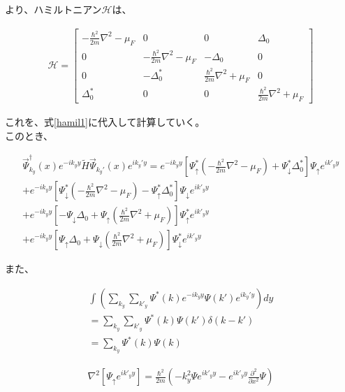 \documentclass{jsarticle}
\begin{document}
		より、ハミルトニアン$\mathcal{H}$は、

		\begin{align}
			\mathcal{H}=
			\begin{bmatrix}
				-\frac{\hbar^2}{2m}\nabla^2-\mu_F & 0 & 0 & \Delta_0 \\
				0 & -\frac{\hbar^2}{2m}\nabla^2-\mu_F & -\Delta_0 & 0 \\
				0 & -\Delta_0^\ast & \frac{\hbar^2}{2m}\nabla^2+\mu_F & 0 \\
				\Delta_0^\ast & 0 & 0 & \frac{\hbar^2}{2m}\nabla^2+\mu_F
			\end{bmatrix}
		\end{align}

		これを、式\eqref{hamil1}に代入して計算していく。　\\
		このとき、

		\begin{align}
			\vec{\Psi}_{k_y}^\dagger(x) e^{-ik_yy} \tilde{H}  \vec{\Psi}_{k_y'}(x) e^{ik_y'y} =
			e^{-ik_yy} \left[ \Psi_\uparrow^\ast \left( -\frac{\hbar^2}{2m}\nabla^2-\mu_F \right) +\Psi_\downarrow^\ast \Delta_0^\ast \right] \Psi_\uparrow e^{ik'_yy} \nonumber\\
			+e^{-ik_yy} \left[ \Psi_\downarrow^\ast \left( -\frac{\hbar^2}{2m}\nabla^2-\mu_F \right) -\Psi_\uparrow^\ast \Delta_0^\ast \right] \Psi_\downarrow e^{ik'_yy} \nonumber\\
			+ e^{-ik_yy} \left[ -\Psi_\downarrow\Delta_0 +\Psi_\uparrow \left( \frac{\hbar^2}{2m}\nabla^2+\mu_F \right) \right] \Psi_\uparrow^\ast e^{ik'_yy} \nonumber\\
			+e^{-ik_yy} \left[ \Psi_\uparrow\Delta_0 +\Psi_\downarrow \left( \frac{\hbar^2}{2m}\nabla^2+\mu_F \right) \right] \Psi_\downarrow^\ast e^{ik'_yy}
		\end{align}

		また、
		
		\begin{align}
		\int \left( \sum_{k_y}\sum_{k'_y}\Psi^\ast(k) e^{-ik_yy}\Psi(k')e^{ik_y'y} \right) dy \nonumber \\
		=\sum_{k_y}\sum_{k'_y}\Psi^\ast(k) \Psi(k')\delta \left( k-k' \right) \nonumber \\
		=\sum_{k_y}\Psi^\ast(k)\Psi(k)
		\end{align}
		
		\begin{align}
			\nabla^2 \left[ \Psi_\uparrow e^{ik'_yy} \right]=
			\frac{\hbar^2}{2m}
			\left( -k_y^2\Psi e^{ik'_yy} - e^{ik'_yy}\frac{\partial^2}{\partial x^2}\Psi \right) 
		\end{align}
		
\end{document}
